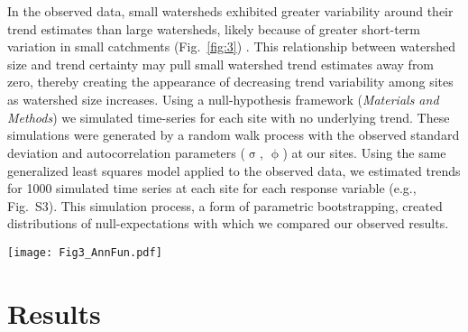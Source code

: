 \documentclass[9pt,twocolumn,twoside,lineno]{pnas-new}
\begin{document}
In the observed data, small watersheds exhibited greater variability around their trend estimates than large watersheds, likely because of greater short-term variation in small catchments (Fig.~\ref{fig:3}) \cite{Moore:2015}. This relationship between watershed size and trend certainty may pull small watershed trend estimates away from zero, thereby creating the appearance of decreasing trend variability among sites as watershed size increases. Using a null-hypothesis framework (\textit{Materials and Methods}) we simulated time-series for each site with no underlying trend. These simulations were generated by a random walk process with the observed standard deviation and autocorrelation parameters ($\hat{\upsigma}$, $\hat{\upphi}$) at our sites. Using the same generalized least squares model applied to the observed data, we estimated trends for 1000 simulated time series at each site for each response variable (e.g., Fig.~S3). This simulation process, a form of parametric bootstrapping, created distributions of null-expectations with which we compared our observed results.

\begin{figure*}[h]
\centering
\texttt{[image: Fig3\_AnnFun.pdf]}
	\caption{Annual flow trend attenuation within the Fraser River basin. (\textbf{Left}) Trend estimates $\pm$ one standard error (SE, grey) plotted against watershed area (km\textsuperscript{2}), colored by climate portfolio strength (green = small, blue = large). Blue lines represent observed attenuation; orange and red represent simulated attenuation that is weaker and stronger than observed. (\textbf{Right}) Density plots show null model simulated variance exponents ($\hat{\updelta}$) and the proportion on either side of the observed variance exponent (blue). Flow metrics include long-term flow-timing shifts (change per decade in day-of-year (DOY) to half annual flow), where decreasing trends suggest more annual flow is occurring earlier in the year (a), and the percent change per decade in minimum (b), maximum (c) and median (d) annual flow. Simulated lines ignore variance in the intercept and slope to focus visually on attenuation.}
\label{fig:3}
\end{figure*}

\section*{Results}
\end{document}
